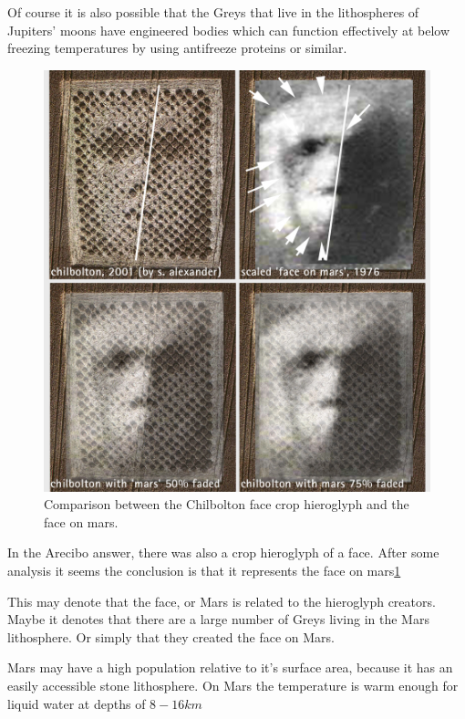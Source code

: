 \documentclass{report}
\begin{document}
Of course it is also possible that the Greys that live in the lithospheres of
Jupiters' moons have engineered bodies which can function effectively at below
freezing temperatures by using antifreeze proteins or similar. 

\begin{figure}
  \includegraphics{photograph/chilbolton_mars_face.jpg}
  \caption{Comparison between the Chilbolton face crop hieroglyph and the face on
mars.}
\label{fig:marsface}
\end{figure}

In the Arecibo answer, there was also a crop hieroglyph of a face. After some
analysis it seems the conclusion is that it represents the face on
mars\ref{fig:marsface}\cite{chilbolton}

This may denote that the face, or Mars is related to the hieroglyph creators.
Maybe it denotes that there are a large number of Greys living in the Mars
lithosphere. Or simply that they created the face on Mars. 

Mars may have a high population relative to it's surface area, 
because it has an easily accessible stone lithosphere. On Mars the temperature
is warm enough for liquid water at depths of $8-16km$\cite{marswater}
\end{document}
